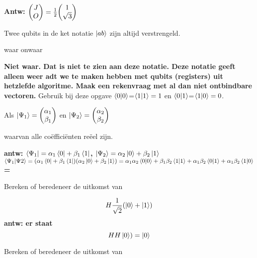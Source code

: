 \documentclass[a4paper, addpoints, 12pt
    , answers    %
    ]{exam}
\begin{document}
\begin{questions}
\begin{parts}
\ifprintanswers
\textbf{Antw: $\mqty(J\\O)= \frac{1}{2}\mqty(1\\\sqrt{3})$
}
\else
\fillwithlines{.5in}
\fi
\end{parts}

\question[1]
Twee qubits in de ket notatie $\ket{ab}$ zijn altijd verstrengeld.

\begin{oneparchoices}
\choice waar
\correctchoice onwaar
\end{oneparchoices}


\ifprintanswers
\textbf{Niet waar. Dat is niet te zien aan deze notatie. Deze notatie geeft alleen weer adt we te maken hebben met qubits (registers) uit hetzlefde algoritme. Maak een rekenvraag met al dan niet ontbindbare vectoren.
}
\fi
\question[1]
Gebruik bij deze opgave $\braket{0}{0}$=$\braket{1}{1} = 1$ en
$\braket{0}{1}$=$\braket{1}{0} = 0$.

Als $\ket{\Psi_1}=\mqty(\alpha_1\\\beta_1)$
 en $\ket{\Psi_2}=\mqty(\alpha_2\\\beta_2)$

waarvan alle co\"effici\"enten re\"eel zijn.

\ifprintanswers
\textbf{antw:
$\bra{\Psi_1}=\alpha_1\bra{0} +\beta_1\bra{1}$, 
$\ket{\Psi_2}=\alpha_2\ket{0} +\beta_2\ket{1}$\\
$\braket{\Psi_1}{\Psi2}=(\alpha_1\bra{0} +\beta_1\bra{1})(\alpha_2\ket{0} +\beta_2\ket{1})\\
=\alpha_1\alpha_2\braket{0}{0}+\beta_1\beta_2\braket{1}{1}+\alpha_1\beta_2\braket{0}{1}+\alpha_1\beta_2\braket{1}{0}$=\\
}
\else
\fillwithlines{1in}
\fi

\question[1]
Bereken of beredeneer de uitkomst van 

\[H\frac{1}{\sqrt{2}}(\ket{0}+\ket{1})\]
\ifprintanswers
\textbf{antw:
er staat \[HH\ket{0})=\ket{0}\]
}
\else
\fillwithlines{1in}
\fi

\question[1]
Bereken of beredeneer de uitkomst van 


\end{questions}
\end{document}
